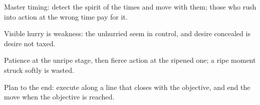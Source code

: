 

\begin{distilled}
  \item Master timing: detect the spirit of the times and move with them; those who rush into action at the wrong time pay for it.
  \item Visible hurry is weakness: the unhurried seem in control, and desire concealed is desire not taxed.
  \item Patience at the unripe stage, then fierce action at the ripened one; a ripe moment struck softly is wasted.
  \item Plan to the end: execute along a line that closes with the objective, and end the move when the objective is reached.
\end{distilled}
